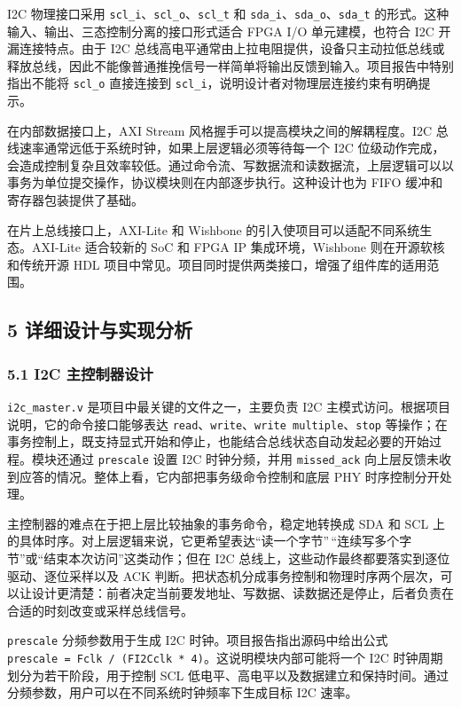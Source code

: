I2C 物理接口采用 \texttt{scl\_i}、\texttt{scl\_o}、\texttt{scl\_t} 和 \texttt{sda\_i}、\texttt{sda\_o}、\texttt{sda\_t} 的形式。这种输入、输出、三态控制分离的接口形式适合 FPGA I/O 单元建模，也符合 I2C 开漏连接特点。由于 I2C 总线高电平通常由上拉电阻提供，设备只主动拉低总线或释放总线，因此不能像普通推挽信号一样简单将输出反馈到输入。项目报告中特别指出不能将 \texttt{scl\_o} 直接连接到 \texttt{scl\_i}，说明设计者对物理层连接约束有明确提示。

在内部数据接口上，AXI Stream 风格握手可以提高模块之间的解耦程度。I2C 总线速率通常远低于系统时钟，如果上层逻辑必须等待每一个 I2C 位级动作完成，会造成控制复杂且效率较低。通过命令流、写数据流和读数据流，上层逻辑可以以事务为单位提交操作，协议模块则在内部逐步执行。这种设计也为 FIFO 缓冲和寄存器包装提供了基础。

在片上总线接口上，AXI-Lite 和 Wishbone 的引入使项目可以适配不同系统生态。AXI-Lite 适合较新的 SoC 和 FPGA IP 集成环境，Wishbone 则在开源软核和传统开源 HDL 项目中常见。项目同时提供两类接口，增强了组件库的适用范围。

\subsection{5 详细设计与实现分析}\label{ux8be6ux7ec6ux8bbeux8ba1ux4e0eux5b9eux73b0ux5206ux6790}

\subsubsection{5.1 I2C 主控制器设计}\label{i2c-ux4e3bux63a7ux5236ux5668ux8bbeux8ba1}

\texttt{i2c\_master.v} 是项目中最关键的文件之一，主要负责 I2C 主模式访问。根据项目说明，它的命令接口能够表达 \texttt{read}、\texttt{write}、\texttt{write\ multiple}、\texttt{stop} 等操作；在事务控制上，既支持显式开始和停止，也能结合总线状态自动发起必要的开始过程。模块还通过 \texttt{prescale} 设置 I2C 时钟分频，并用 \texttt{missed\_ack} 向上层反馈未收到应答的情况。整体上看，它内部把事务级命令控制和底层 PHY 时序控制分开处理。

主控制器的难点在于把上层比较抽象的事务命令，稳定地转换成 SDA 和 SCL 上的具体时序。对上层逻辑来说，它更希望表达``读一个字节''\,``连续写多个字节''或``结束本次访问''这类动作；但在 I2C 总线上，这些动作最终都要落实到逐位驱动、逐位采样以及 ACK 判断。把状态机分成事务控制和物理时序两个层次，可以让设计更清楚：前者决定当前要发地址、写数据、读数据还是停止，后者负责在合适的时刻改变或采样总线信号。

\texttt{prescale} 分频参数用于生成 I2C 时钟。项目报告指出源码中给出公式 \texttt{prescale\ =\ Fclk\ /\ (FI2Cclk\ *\ 4)}。这说明模块内部可能将一个 I2C 时钟周期划分为若干阶段，用于控制 SCL 低电平、高电平以及数据建立和保持时间。通过分频参数，用户可以在不同系统时钟频率下生成目标 I2C 速率。

